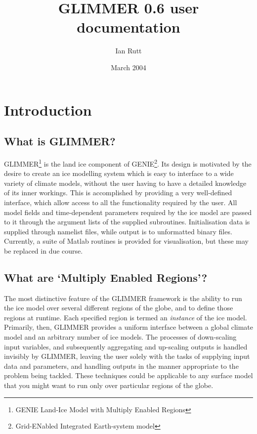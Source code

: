 \documentclass[11pt]{article}
\begin{document}
\title{GLIMMER 0.6 user documentation}
\date{March 2004}
\author{Ian Rutt}
\maketitle

\section{Introduction}

\subsection{What is GLIMMER?}

GLIMMER\footnote{GENIE Land-Ice Model with Multiply Enabled
Regions} is the land ice component of GENIE\footnote{Grid-ENabled
Integrated Earth-system model}. Its design is motivated by the desire to
create an ice modelling system which is easy to interface to a wide variety of
climate models, without 
the user having to have a detailed knowledge of its inner workings. This is
accomplished by providing a very well-defined interface, which allow access to
all the functionality required by the user. All model fields and
time-dependent parameters required by the ice model are passed to it through
the argument lists of the supplied subroutines. Initialisation data is
supplied through namelist files, while output is to unformatted binary
files. Currently, a suite of Matlab routines is provided for visualisation,
but these may be replaced in due course.

\subsection{What are `Multiply Enabled Regions'?}

The most distinctive feature of the GLIMMER framework is the ability to
run the ice model over several different regions of the globe, and to define
those regions at runtime. Each specified region is termed an \emph{instance}
of the ice model. Primarily, then, GLIMMER provides a uniform interface
between a global climate model and an arbitrary number of ice models. The
processes of down-scaling input variables, and subsequently aggregating and
up-scaling outputs is handled invisibly by GLIMMER, leaving the user solely
with the tasks of supplying input data and parameters, and handling outputs in
the manner appropriate to the problem being tackled. These techniques could be
applicable to any surface model that you might want to run only over
particular regions of the globe.
\end{document}
